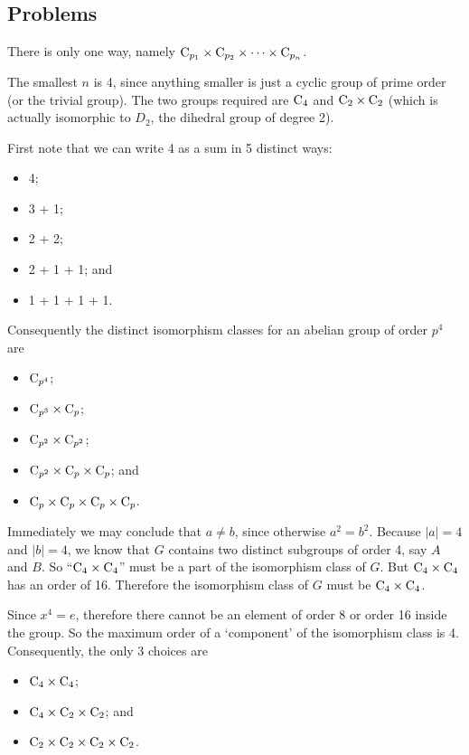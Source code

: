 \subsection*{Problems}
\begin{questions}
    \item There is only one way, namely $\mathrm{C}_{p_1}\times\mathrm{C}_{p_2}\times\cdots\times\mathrm{C}_{p_n}$.

    \item The smallest $n$ is 4, since anything smaller is just a cyclic group of prime order (or the trivial group). The two groups required are $\mathrm{C}_{4}$ and $\mathrm{C}_{2} \times \mathrm{C}_{2}$ (which is actually isomorphic to $D_2$, the dihedral group of degree 2).

    \item First note that we can write 4 as a sum in 5 distinct ways:
    \begin{itemize}
        \item 4;
        \item 3 + 1;
        \item 2 + 2;
        \item 2 + 1 + 1; and
        \item 1 + 1 + 1 + 1.
    \end{itemize}
    Consequently the distinct isomorphism classes for an abelian group of order $p^4$ are
    \begin{itemize}
        \item $\mathrm{C}_{p^4}$;
        \item $\mathrm{C}_{p^3}\times\mathrm{C}_{p}$;
        \item $\mathrm{C}_{p^2}\times\mathrm{C}_{p^2}$;
        \item $\mathrm{C}_{p^2}\times\mathrm{C}_{p}\times\mathrm{C}_{p}$; and
        \item $\mathrm{C}_{p}\times\mathrm{C}_{p}\times\mathrm{C}_{p}\times\mathrm{C}_{p}$.
    \end{itemize}

    \item Immediately we may conclude that $a \neq b$, since otherwise $a^2 = b^2$. Because $|a| = 4$ and $|b| = 4$, we know that $G$ contains two distinct subgroups of order 4, say $A$ and $B$. So ``$\mathrm{C}_{4} \times \mathrm{C}_{4}$'' must be a part of the isomorphism class of $G$. But $\mathrm{C}_{4} \times \mathrm{C}_{4}$ has an order of 16. Therefore the isomorphism class of $G$ must be $\mathrm{C}_{4} \times \mathrm{C}_{4}$.

    \item Since $x^4 = e$, therefore there cannot be an element of order 8 or order 16 inside the group. So the maximum order of a `component' of the isomorphism class is 4. Consequently, the only 3 choices are
    \begin{itemize}
        \item $\mathrm{C}_{4}\times\mathrm{C}_{4}$;
        \item $\mathrm{C}_{4}\times\mathrm{C}_{2}\times\mathrm{C}_{2}$; and
        \item $\mathrm{C}_{2}\times\mathrm{C}_{2}\times\mathrm{C}_{2}\times\mathrm{C}_{2}$.
    \end{itemize}
\end{questions}
